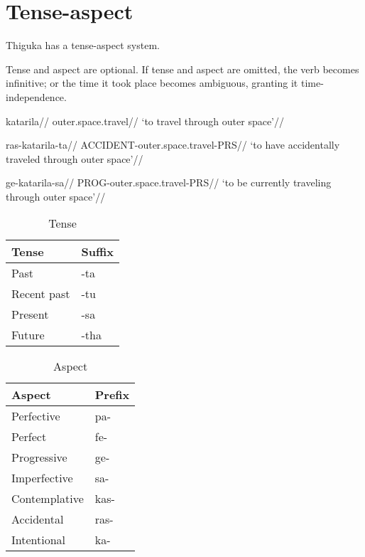 \section{Tense-aspect}
Thiguka has a tense-aspect system.

Tense and aspect are optional.
If tense and aspect are omitted, the verb becomes infinitive; or the time
it took place becomes ambiguous, granting it time-independence.

\ex
\begingl
    \gla katarila//
    \glb outer.space.travel//
    \glft `to travel through outer space'//
\endgl
\xe

\ex
\begingl
    \gla ras-katarila-ta//
    \glb ACCIDENT-outer.space.travel-PRS//
    \glft `to have accidentally traveled through outer space'//
\endgl
\xe

\ex
\begingl
    \gla ge-katarila-sa//
    \glb PROG-outer.space.travel-PRS//
    \glft `to be currently traveling through outer space'//
\endgl
\xe

\begin{table}[h!]
    \centering
    \caption{Tense}
    \begin{tabularx}{8cm}{|X|X|}
        \hline
        \textbf{Tense} & \textbf{Suffix} \\
        \hline
        Past & -ta \\
        Recent past & -tu \\
        Present & -sa \\
        Future & -tha \\
        \hline
    \end{tabularx}
\end{table}

\begin{table}[h!]
    \centering
    \caption{Aspect}
    \begin{tabularx}{8cm}{|X|X|}
        \hline
        \textbf{Aspect} & \textbf{Prefix} \\
        \hline
        Perfective & pa- \\
        Perfect & fe- \\
        Progressive & ge- \\
        Imperfective & sa- \\
        Contemplative & kas- \\
        Accidental & ras- \\
        Intentional & ka- \\
        \hline
    \end{tabularx}
\end{table}

